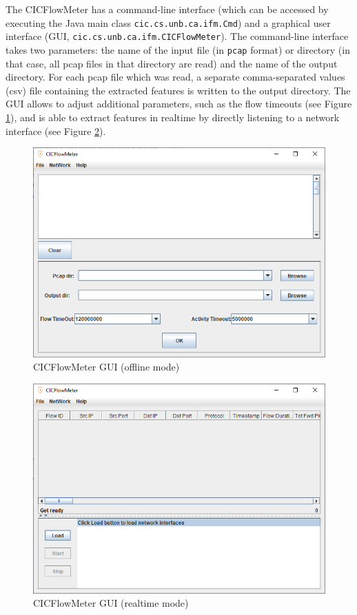\documentclass[conference]{IEEEtran}
\begin{document}
The CICFlowMeter has a command-line interface (which can be accessed by executing the Java main class \verb|cic.cs.unb.ca.ifm.Cmd|) and a graphical user interface (GUI, \verb|cic.cs.unb.ca.ifm.CICFlowMeter|). The command-line interface takes two parameters: the name of the input file (in \verb|pcap| format) or directory (in that case, all pcap files in that directory are read) and the name of the output directory. For each pcap file which was read, a separate comma-separated values (csv) file containing the extracted features is written to the output directory. The GUI allows to adjust additional parameters, such as the flow timeouts (see Figure \ref{fig:cicflowmeter_offline}), and is able to extract features in realtime by directly listening to a network interface (see Figure \ref{fig:cicflowmeter_realtime}).

\begin{figure}[htbp]  
\centerline{\includegraphics[scale=0.45]{CICFlowMeterOffline.png}}
\caption{CICFlowMeter GUI (offline mode)}
\label{fig:cicflowmeter_offline}
\end{figure}

\begin{figure}[htbp]  
\centerline{\includegraphics[scale=0.45]{CICFlowMeterRealtime.png}}
\caption{CICFlowMeter GUI (realtime mode)}
\label{fig:cicflowmeter_realtime}
\end{figure}
\end{document}
